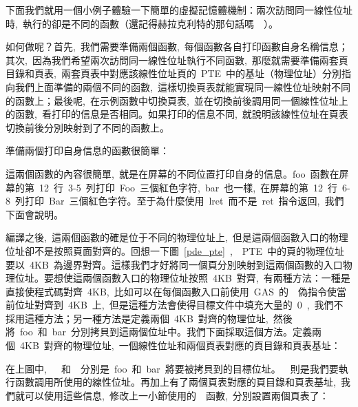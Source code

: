 下面我們就用一個小例子體驗一下簡單的虛擬記憶體機制：兩次訪問同一線性位址時,~執行的卻是不同的函數（還記得赫拉克利特的那句話嗎~\smiley~）。

如何做呢？首先,~我們需要準備兩個函數,~每個函數各自打印函數自身名稱信息；其次,~因為我們希望兩次訪問同一線性位址執行不同函數,~那麼就需要準備兩套頁目錄和頁表,~兩套頁表中對應該線性位址頁的~PTE~中的基址（物理位址）分別指向我們上面準備的兩個不同的函數,~這樣切換頁表就能實現同一線性位址映射不同的函數上；最後呢,~在示例函數中切換頁表,~並在切換前後調用同一個線性位址上的函數,~看打印的信息是否相同。如果打印的信息不同,~就說明該線性位址在頁表切換前後分別映射到了不同的函數上。

準備兩個打印自身信息的函數很簡單：


這兩個函數的內容很簡單,~就是在屏幕的不同位置打印自身的信息。foo~函數在屏幕的第~12~行~3-5~列打印~Foo~三個紅色字符,~bar~也一樣,~在屏幕的第~12~行~6-8~列打印~Bar~三個紅色字符。至于為什麼使用~lret~而不是~ret~指令返回,~我們下面會說明。

編譯之後,~這兩個函數的確是位于不同的物理位址上,~但是這兩個函數入口的物理位址卻不是按照頁面對齊的。回想一下圖~\ref{pde_pte}~,~~PTE~中的頁的物理位址要以~4KB~為邊界對齊。這樣我們才好將同一個頁分別映射到這兩個函數的入口物理位址。要想使這兩個函數入口的物理位址按照~4KB~對齊,~有兩種方法：一種是直接使程式碼對齊~4KB,~比如可以在每個函數入口前使用~GAS~的~~偽指令使當前位址對齊到~4KB~上,~但是這種方法會使得目標文件中填充大量的~0~,~我們不採用這種方法；另一種方法是定義兩個~4KB~對齊的物理位址,~然後將~foo~和~bar~分別拷貝到這兩個位址中。我們下面採取這個方法。定義兩個~4KB~對齊的物理位址,~一個線性位址和兩個頁表對應的頁目錄和頁表基址：


在上圖中,~~~和~~分別是~foo~和~bar~將要被拷貝到的目標位址。~~則是我們要執行函數調用所使用的線性位址。再加上有了兩個頁表對應的頁目錄和頁表基址,~我們就可以使用這些信息,~修改上一小節使用的~~函數,~分別設置兩個頁表了：

